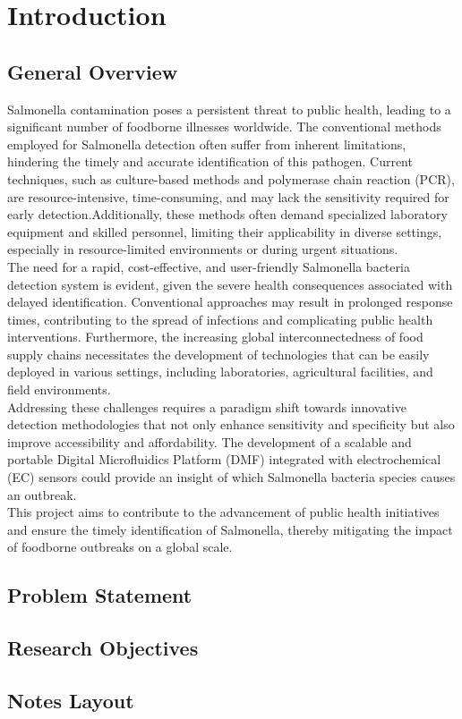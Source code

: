 \chapter{Introduction}
\section{General Overview}
Salmonella contamination poses a persistent threat to public health, leading to a significant
number of foodborne illnesses worldwide. The conventional methods employed for Salmonella detection often suffer from inherent limitations, hindering the timely and accurate identification of this pathogen. Current techniques, such as culture-based methods and
polymerase chain reaction (PCR), are resource-intensive, time-consuming, and may lack
the sensitivity required for early detection.Additionally, these methods often demand specialized
laboratory equipment and skilled personnel, limiting their applicability in diverse settings, especially in resource-limited environments or during urgent situations.\\

The need for a rapid, cost-effective, and user-friendly Salmonella bacteria detection system is evident, given the severe health consequences associated with delayed identification. Conventional approaches may result in prolonged response times, contributing to the spread of infections and complicating public health interventions. Furthermore, the increasing global interconnectedness of food supply chains necessitates the development of technologies that
can be easily deployed in various settings, including laboratories, agricultural facilities, and field environments.\\

Addressing these challenges requires a paradigm shift towards innovative detection methodologies
that not only enhance sensitivity and specificity but also improve accessibility and affordability. The development of a scalable and portable Digital Microfluidics Platform (DMF) integrated with electrochemical (EC) sensors could provide an insight of which Salmonella bacteria species causes an outbreak.\\

This project aims to contribute to the advancement of public health initiatives and ensure the timely identification of Salmonella, thereby mitigating the impact of foodborne outbreaks
on a global scale.

\section{Problem Statement}
\section{Research Objectives}
\section{Notes Layout}